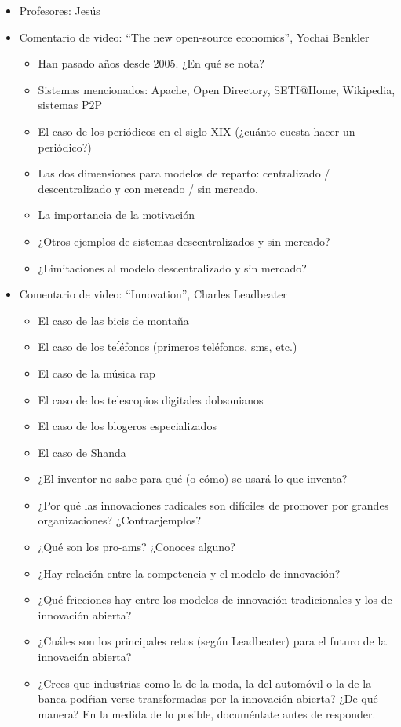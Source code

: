 \documentclass[a4paper,12pt]{article}
\begin{document}
\begin{itemize}
\item Profesores: Jesús
\item Comentario de video: ``The new open-source economics'', Yochai Benkler 
  \begin{itemize}
  \item Han pasado años desde 2005. ¿En qué se nota?
  \item Sistemas mencionados: Apache, Open Directory, SETI@Home, Wikipedia, sistemas P2P
  \item El caso de los periódicos en el siglo XIX (¿cuánto cuesta hacer un periódico?) 
  \item Las dos dimensiones para modelos de reparto: centralizado / descentralizado y con mercado / sin mercado.
  \item La importancia de la motivación
  \item ¿Otros ejemplos de sistemas descentralizados y sin mercado?
  \item ¿Limitaciones al modelo descentralizado y sin mercado?
  \end{itemize}
\item Comentario de video: ``Innovation'', Charles Leadbeater
  \begin{itemize}
  \item El caso de las bicis de montaña
  \item El caso de los teĺéfonos (primeros teléfonos, sms, etc.)
  \item El caso de la música rap
  \item El caso de los telescopios digitales dobsonianos
  \item El caso de los blogeros especializados
  \item El caso de Shanda
  \item ¿El inventor no sabe para qué (o cómo) se usará lo que inventa?
  \item ¿Por qué las innovaciones radicales son difíciles de promover por grandes organizaciones? ¿Contraejemplos?
  \item ¿Qué son los pro-ams? ¿Conoces alguno?
  \item ¿Hay relación entre la competencia y el modelo de innovación?
  \item ¿Qué fricciones hay entre los modelos de innovación tradicionales y los de innovación abierta?
  \item ¿Cuáles son los principales retos (según Leadbeater) para el futuro de la innovación abierta?
  \item ¿Crees que industrias como la de la moda, la del automóvil o la de la banca podŕian verse transformadas por la innovación abierta? ¿De qué manera? En la medida de lo posible, documéntate antes de responder.

\end{itemize}
\end{itemize}
\end{document}
